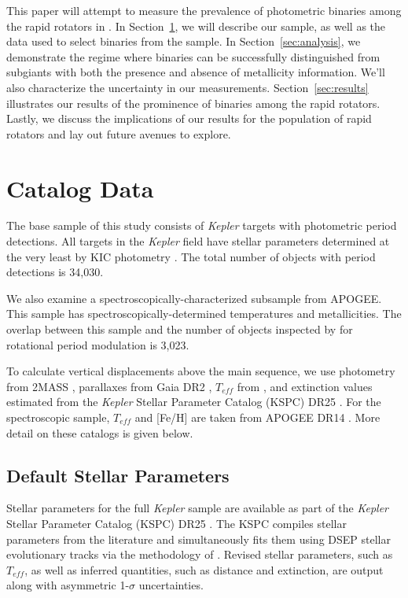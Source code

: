 \documentclass[manuscript]{aastex6}
\newcommand{\Kepler}{\mbox{\textit{Kepler}}}
\newcommand{\Teff}{\ensuremath{T_{eff}}}
\begin{document}
This paper will attempt to measure the prevalence of photometric binaries among
the rapid rotators in \citet{McQuillan14}. In Section~\ref{sec:data}, we will 
describe our sample, as well as the data used to select binaries from the 
sample. In Section~\ref{sec:analysis}, we demonstrate the regime where 
binaries can be successfully distinguished from subgiants with both the 
presence and absence of metallicity information. We'll also characterize the 
uncertainty in our measurements. Section~\ref{sec:results} illustrates our 
results of the prominence of binaries among the rapid rotators. Lastly, we 
discuss the implications of our results for the population of rapid rotators 
and lay out future avenues to explore.

\section{Catalog Data}
\label{sec:data}

The base sample of this study consists of \Kepler{} targets with photometric
period detections. All targets in the \Kepler{} field have stellar parameters
determined at the very least by KIC photometry \citep{Brown11}. The total
number of objects with period detections is 34,030.

We also examine a spectroscopically-characterized subsample from APOGEE\@. 
This sample has spectroscopically-determined temperatures and metallicities. 
The overlap between this sample and the number of objects inspected by 
\citet{McQuillan14} for rotational period modulation is 3,023.

To calculate vertical displacements above the main sequence, we use photometry
from 2MASS \citep{Skrutskie06}, parallaxes from Gaia DR2 \citep{Gaia18},
\Teff{} from \citet{Pinsonneault12}, and extinction values estimated from the 
\Kepler{} Stellar Parameter Catalog (KSPC) DR25 \citep{Huber14,Mathur17}. 
For the spectroscopic sample, \Teff{} and [Fe/H] are taken from APOGEE DR14 
\citep{Abolfathi18}. More detail on these catalogs is given below.

\subsection{Default Stellar Parameters}

Stellar parameters for the full \Kepler{} sample are available as part of the
\Kepler{} Stellar Parameter Catalog (KSPC) DR25 \citep{Mathur17}. The KSPC
compiles stellar parameters from the literature and simultaneously fits them
using DSEP \citep{Dotter08} stellar evolutionary tracks via the methodology of
\citet{Huber14}. Revised stellar parameters, such as \Teff, as well as inferred
quantities, such as distance and extinction, are output along with asymmetric
1-\(\sigma\) uncertainties. 
\end{document}
